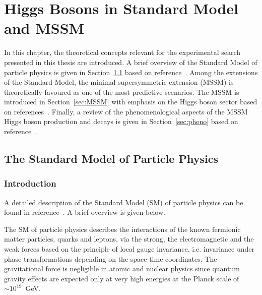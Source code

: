 
\chapter{Higgs Bosons in Standard Model and MSSM} \label{chap:theory}

 \vspace{2cm}

In this chapter,   the theoretical concepts relevant for the experimental search presented in this thesis are introduced.
A brief overview of the Standard Model of particle physics is given in Section~\ref{sec:SM} based on reference~\cite{Altarelli}. 
Among  the extensions of the Standard Model, the minimal supersymmetric 
extension (MSSM) is  theoretically favoured  as one of the most predictive scenarios.
The MSSM is introduced in Section~\ref{sec:MSSM} with  emphasis on the Higgs boson sector
 based on  references~\cite{SusyPrimer,Djuadi}.
Finally, a review of the phenomenological aspects of the MSSM Higgs boson production and decays is given 
in Section~\ref{sec:pheno} based on reference~\cite{LHCxsec}.

\restoregeometry

\clearpage

\section{The Standard Model of Particle Physics} \label{sec:SM}
\subsection{Introduction}
A detailed description of the Standard Model (SM) of particle physics can be found in reference~\cite{Peskin}. A brief overview is
given below.

The SM of particle physics describes the interactions of the known fermionic matter particles, quarks and leptons, via the
strong, the electromagnetic and the weak forces based on  the principle of local gauge invariance,  i.e. invariance under  
phase  transformations depending  on the space-time coordinates.
The gravitational force is negligible in atomic and nuclear physics since 
quantum gravity effects are expected only at very high energies at the  Planck scale of $\sim 10^{19}$~GeV.


